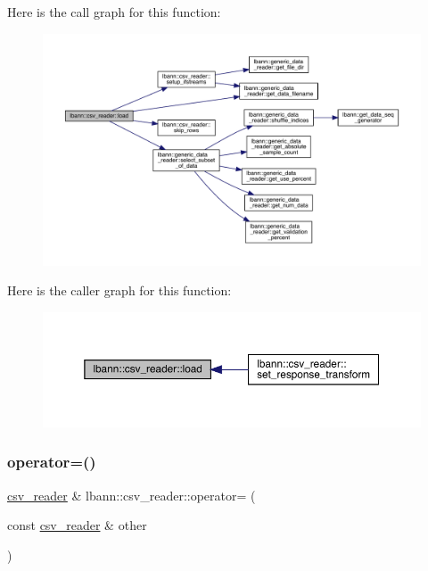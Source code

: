 Here is the call graph for this function\+:\nopagebreak
\begin{figure}[H]
\begin{center}
\leavevmode
\includegraphics[width=350pt]{classlbann_1_1csv__reader_a7b76b23422db407e8fb039cc11a08bc6_cgraph}
\end{center}
\end{figure}
Here is the caller graph for this function\+:\nopagebreak
\begin{figure}[H]
\begin{center}
\leavevmode
\includegraphics[width=350pt]{classlbann_1_1csv__reader_a7b76b23422db407e8fb039cc11a08bc6_icgraph}
\end{center}
\end{figure}
\mbox{\label{classlbann_1_1csv__reader_aaede525f7ac80484691822f27ef79cfc}} 
\subsubsection{\texorpdfstring{operator=()}{operator=()}}
{\footnotesize\ttfamily \hyperlink{classlbann_1_1csv__reader}{csv\+\_\+reader} \& lbann\+::csv\+\_\+reader\+::operator= (\begin{DoxyParamCaption}\item[{const \hyperlink{classlbann_1_1csv__reader}{csv\+\_\+reader} \&}]{other }\end{DoxyParamCaption})}



